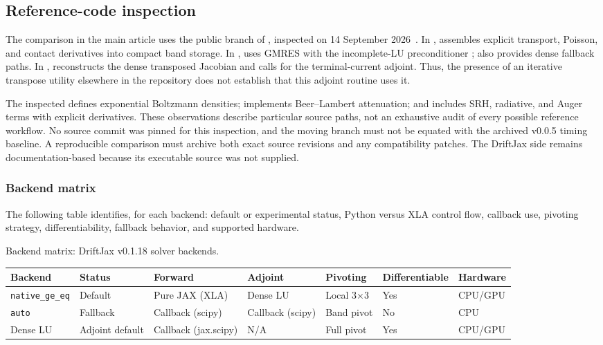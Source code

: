 \documentclass[11pt,a4paper]{article}
\numberwithin{equation}{section}
\begin{document}
\subsection{Reference-code inspection}
The comparison in the main article uses the public  branch
of , inspected on 14 September
2026~\cite{deltapvsource}. In , 
assembles explicit transport, Poisson, and contact derivatives into
compact band storage. In ,  uses GMRES
with the incomplete-LU preconditioner ; 
also provides dense fallback paths. In ,
 reconstructs the dense transposed Jacobian
and calls  for the terminal-current adjoint.
Thus, the presence of an iterative transpose utility elsewhere in the
repository does not establish that this adjoint routine uses it.

The inspected  defines exponential Boltzmann densities;
 implements Beer--Lambert attenuation; and
 includes SRH, radiative, and Auger terms with explicit
derivatives. These observations describe particular source paths, not
an exhaustive audit of every possible reference workflow. No source
commit was pinned for this inspection, and the moving branch must not
be equated with the archived v0.0.5 timing baseline. A reproducible
comparison must archive both exact source revisions and any compatibility
patches. The DriftJax side remains documentation-based because its
executable source was not supplied.

\subsubsection{Backend matrix}
\label{sec:backend-matrix}
The following table identifies, for each backend: default or experimental status, Python versus XLA control flow, callback use, pivoting strategy, differentiability, fallback behavior, and supported hardware.

\begin{papertable}
\centering
\caption{Backend matrix: DriftJax v0.1.18 solver backends.}
\label{tab:backend-matrix}
\begin{tabular}{@{}lllllll@{}}
\toprule
Backend & Status & Forward & Adjoint & Pivoting & Differentiable & Hardware \\
\midrule
\texttt{native\_ge\_eq} & Default & Pure JAX (XLA) & Dense LU & Local 3×3 & Yes & CPU/GPU \\
\texttt{auto} & Fallback & Callback (scipy) & Callback (scipy) & Band pivot & No & CPU \\
Dense LU & Adjoint default & Callback (jax.scipy) & N/A & Full pivot & Yes & CPU/GPU \\
\bottomrule
\end{tabular}
\end{papertable}
\end{document}
